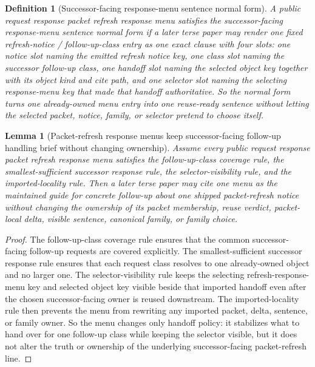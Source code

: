 \documentclass[11pt]{article}
\newtheorem{definition}{Definition}
\newtheorem{lemma}{Lemma}
\begin{document}
\begin{definition}[Successor-facing response-menu sentence normal form]
A public request response packet refresh response menu satisfies the \emph{successor-facing response-menu sentence normal form} if a later terse paper may render one fixed refresh-notice / follow-up-class entry as one exact clause with four slots: one notice slot naming the emitted refresh notice key, one class slot naming the successor follow-up class, one handoff slot naming the selected object key together with its object kind and cite path, and one selector slot naming the selecting response-menu key that made that handoff authoritative.
So the normal form turns one already-owned menu entry into one reuse-ready sentence without letting the selected packet, notice, family, or selector pretend to choose itself.
\end{definition}

\begin{lemma}[Packet-refresh response menus keep successor-facing follow-up handling brief without changing ownership]
Assume every public request response packet refresh response menu satisfies the follow-up-class coverage rule, the smallest-sufficient successor response rule, the selector-visibility rule, and the imported-locality rule.
Then a later terse paper may cite one menu as the maintained guide for concrete follow-up about one shipped packet-refresh notice without changing the ownership of its packet membership, reuse verdict, packet-local delta, visible sentence, canonical family, or family choice.
\end{lemma}

\begin{proof}
The follow-up-class coverage rule ensures that the common successor-facing follow-up requests are covered explicitly.
The smallest-sufficient successor response rule ensures that each request class resolves to one already-owned object and no larger one.
The selector-visibility rule keeps the selecting refresh-response-menu key and selected object key visible beside that imported handoff even after the chosen successor-facing owner is reused downstream.
The imported-locality rule then prevents the menu from rewriting any imported packet, delta, sentence, or family owner.
So the menu changes only handoff policy: it stabilizes what to hand over for one follow-up class while keeping the selector visible, but it does not alter the truth or ownership of the underlying successor-facing packet-refresh line.\qedhere
\end{proof}
\end{document}
